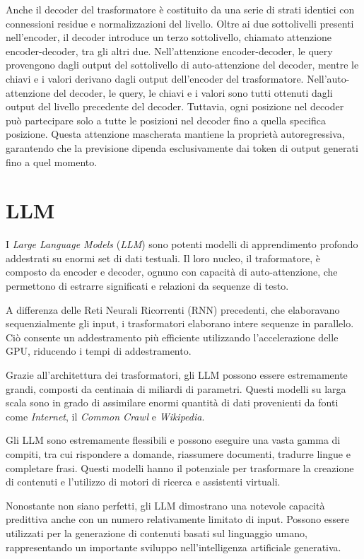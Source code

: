 Anche il decoder del trasformatore è costituito da una serie di strati identici con connessioni residue e normalizzazioni del livello. Oltre ai due sottolivelli presenti nell'encoder, il decoder introduce un terzo sottolivello, chiamato attenzione encoder-decoder, tra gli altri due. Nell'attenzione encoder-decoder, le query provengono dagli output del sottolivello di auto-attenzione del decoder, mentre le chiavi e i valori derivano dagli output dell'encoder del trasformatore. Nell'auto-attenzione del decoder, le query, le chiavi e i valori sono tutti ottenuti dagli output del livello precedente del decoder. Tuttavia, ogni posizione nel decoder può partecipare solo a tutte le posizioni nel decoder fino a quella specifica posizione. Questa attenzione mascherata mantiene la proprietà autoregressiva, garantendo che la previsione dipenda esclusivamente dai token di output generati fino a quel momento.


\section{LLM}\label{sec:llm}

I \emph{Large Language Models} (\emph{LLM}) sono potenti modelli di apprendimento profondo addestrati su enormi set di dati testuali. Il loro nucleo, il traformatore, è composto da encoder e decoder, ognuno con capacità di auto-attenzione, che permettono di estrarre significati e relazioni da sequenze di testo.

A differenza delle Reti Neurali Ricorrenti (RNN) precedenti, che elaboravano sequenzialmente gli input, i trasformatori elaborano intere sequenze in parallelo. Ciò consente un addestramento più efficiente utilizzando l'accelerazione delle GPU, riducendo i tempi di addestramento.

Grazie all'architettura dei trasformatori, gli LLM possono essere estremamente grandi, composti da centinaia di miliardi di parametri. Questi modelli su larga scala sono in grado di assimilare enormi quantità di dati provenienti da fonti come \emph{Internet}, il \emph{Common Crawl} e \emph{Wikipedia}.

Gli LLM sono estremamente flessibili e possono eseguire una vasta gamma di compiti, tra cui rispondere a domande, riassumere documenti, tradurre lingue e completare frasi. Questi modelli hanno il potenziale per trasformare la creazione di contenuti e l'utilizzo di motori di ricerca e assistenti virtuali.

Nonostante non siano perfetti, gli LLM dimostrano una notevole capacità predittiva anche con un numero relativamente limitato di input. Possono essere utilizzati per la generazione di contenuti basati sul linguaggio umano, rappresentando un importante sviluppo nell'intelligenza artificiale generativa.

